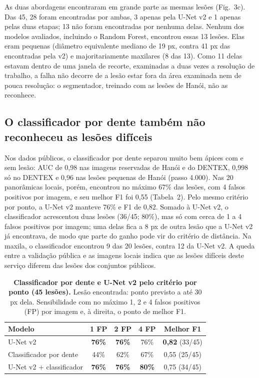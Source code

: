 \documentclass[twocolumn]{article}
\begin{document}
As duas abordagens encontraram em grande parte as mesmas lesões (Fig.~3c). Das 45, 28 foram encontradas por ambas, 3 apenas pela U-Net v2 e 1 apenas pelas duas etapas; 13 não foram encontradas por nenhuma delas. Nenhum dos modelos avaliados, incluindo o Random Forest, encontrou essas 13 lesões. Elas eram pequenas (diâmetro equivalente mediano de 19 px, contra 41 px das encontradas pela v2) e majoritariamente maxilares (8 das 13). Como 11 delas estavam dentro de uma janela de recorte, examinadas a duas vezes a resolução de trabalho, a falha não decorre de a lesão estar fora da área examinada nem de pouca resolução: o segmentador, treinado com as lesões de Hanói, não as reconhece.

\subsection{O classificador por dente também não reconheceu as lesões difíceis}

Nos dados públicos, o classificador por dente separou muito bem ápices com e sem lesão: AUC de 0,98 nas imagens reservadas de Hanói e do DENTEX, 0,998 só no DENTEX e 0,96 nas lesões pequenas de Hanói (passo 4.000). Nas 20 panorâmicas locais, porém, encontrou no máximo 67\% das lesões, com 4 falsos positivos por imagem, e seu melhor F1 foi 0,55 (Tabela~2). Pelo mesmo critério por ponto, a U-Net v2 manteve 76\% e F1 de 0,82. Somado à U-Net v2, o classificador acrescentou duas lesões (36/45; 80\%), mas só com cerca de 1 a 4 falsos positivos por imagem; uma delas fica a 8 px de outra lesão que a U-Net v2 já encontrava, de modo que parte do ganho pode vir do critério de distância. Na maxila, o classificador encontrou 9 das 20 lesões, contra 12 da U-Net v2. A queda entre a validação pública e as imagens locais indica que as lesões difíceis deste serviço diferem das lesões dos conjuntos públicos.

\begin{table}[!t]
\caption{\textbf{Classificador por dente e U-Net v2 pelo critério por ponto (45 lesões).} Lesão encontrada: ponto previsto a até 30 px dela. Sensibilidade com no máximo 1, 2 e 4 falsos positivos (FP) por imagem e, à direita, o ponto de melhor F1.}
\centering\tablefont
\begin{tabularx}{\columnwidth}{L c c c c}
\toprule
Modelo & 1 FP & 2 FP & 4 FP & Melhor F1 \\
\midrule
U-Net v2 & \textbf{76\%} & \textbf{76\%} & 76\% & \textbf{0,82} (33/45) \\
Classificador por dente & 44\% & 62\% & 67\% & 0,55 (25/45) \\
U-Net v2 + classificador & \textbf{76\%} & \textbf{76\%} & \textbf{80\%} & 0,75 (34/45) \\
\bottomrule
\end{tabularx}
\end{table}
\end{document}
